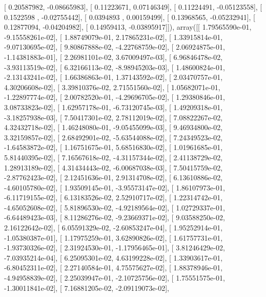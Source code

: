 \documentclass{article}
\begin{document}
       [ 0.20587982, -0.08665983],
       [ 0.11223671,  0.07146349],
       [ 0.11224491, -0.05123558],
       [ 0.1522598 , -0.02755442],
       [ 0.0394893 ,  0.00159499],
       [ 0.13968565, -0.05232941],
       [ 0.12877094, -0.04204982],
       [ 0.14959413, -0.03895917]]), array([[  1.79565590e-01,  -9.15558261e-02],
       [  1.88749079e-01,   2.17865231e-02],
       [  1.33915814e-01,  -9.07130695e-02],
       [  9.80867888e-02,  -4.22768759e-02],
       [  2.06924875e-01,  -1.14381883e-01],
       [  2.26981101e-02,   3.67009497e-03],
       [  6.96846478e-02,  -3.93113519e-02],
       [  6.32166113e-02,  -8.98945203e-03],
       [  1.48600824e-01,  -2.13143241e-02],
       [  1.66386863e-01,   1.37143592e-02],
       [  2.03470757e-01,   4.30206608e-02],
       [  3.39810376e-02,   2.71551560e-02],
       [  1.05682071e-01,  -1.22897774e-02],
       [  2.00782520e-01,  -4.29696705e-02],
       [  1.29380846e-01,   3.08733823e-02],
       [  1.62957178e-01,  -6.73120745e-03],
       [  1.49209318e-01,  -3.18257938e-03],
       [  7.50417301e-02,   2.78112019e-02],
       [  7.08822267e-02,   4.32432718e-02],
       [  1.46248080e-01,  -9.05455099e-03],
       [  9.46934800e-02,   3.32159857e-02],
       [  2.68492901e-02,  -5.63544088e-02],
       [  7.24349523e-02,  -1.64583872e-02],
       [  1.16751675e-01,   5.68516830e-02],
       [  1.01961685e-01,   5.81440395e-02],
       [  7.16567618e-02,  -4.31157344e-02],
       [  2.41138729e-02,   1.28913189e-02],
       [  4.31434443e-02,  -6.00687038e-03],
       [  7.50415759e-02,  -2.87762423e-02],
       [  2.12451636e-01,   2.91314708e-02],
       [  6.13610886e-02,  -4.60105780e-02],
       [  1.93509145e-01,  -3.95573147e-02],
       [  1.86107973e-01,  -6.11719155e-02],
       [  6.13183526e-02,   2.52910717e-02],
       [  1.22314742e-01,  -4.65052608e-02],
       [  5.81896530e-02,  -4.92189564e-02],
       [  1.02729337e-01,  -6.64489423e-03],
       [  8.11286276e-02,  -9.23669371e-02],
       [  9.03588250e-02,   2.16122642e-02],
       [  6.05591329e-02,  -2.60853247e-04],
       [  1.95252914e-01,  -1.05380387e-01],
       [  1.17975259e-01,   3.62890826e-02],
       [  1.61757731e-01,  -1.93730326e-02],
       [  2.31924530e-01,  -1.17956465e-01],
       [  3.81246429e-02,  -7.03935214e-04],
       [  6.25095301e-02,   4.63199228e-02],
       [  1.33903617e-01,  -6.80452311e-02],
       [  2.27140584e-01,   4.75575627e-02],
       [  1.88378946e-01,  -4.94958839e-02],
       [  2.25039947e-01,  -2.10725756e-02],
       [  1.75551575e-01,  -1.30011841e-02],
       [  7.16881205e-02,  -2.09119073e-02],
\end{document}
